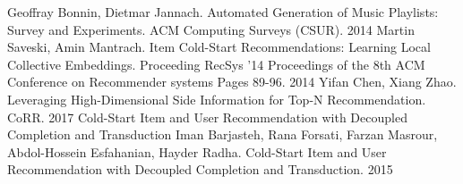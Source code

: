\documentclass[12pt,twoside]{article}
\begin{document}
\begin{thebibliography}{4}
 Geoffray Bonnin,  	Dietmar Jannach. Automated Generation of Music Playlists: Survey and Experiments. ACM Computing Surveys (CSUR). 2014
Martin Saveski, Amin Mantrach. Item Cold-Start Recommendations:
Learning Local Collective Embeddings. Proceeding
RecSys '14 Proceedings of the 8th ACM Conference on Recommender systems
Pages 89-96. 2014
Yifan Chen, Xiang Zhao. Leveraging High-Dimensional Side Information for Top-N Recommendation. CoRR. 2017
Cold-Start Item and User Recommendation with Decoupled Completion and Transduction
Iman Barjasteh, Rana Forsati, Farzan Masrour, Abdol-Hossein Esfahanian, Hayder Radha. Cold-Start Item and User Recommendation with Decoupled Completion and Transduction. 2015
\end{thebibliography}
\end{document}
